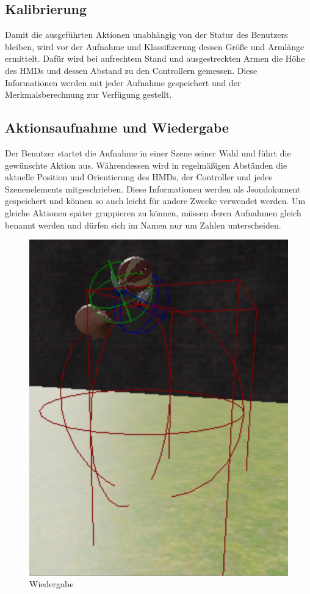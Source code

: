 \subsection{Kalibrierung}
Damit die ausgeführten Aktionen unabhängig von der Statur des Benutzers bleiben, wird vor der Aufnahme und Klassifizerung dessen Größe und Armlänge ermittelt. Dafür wird bei aufrechtem Stand und ausgestreckten Armen die Höhe des HMDs und dessen Abstand zu den Controllern gemessen. Diese Informationen werden mit jeder Aufnahme gespeichert und der Merkmalsberechnung zur Verfügung gestellt. 

\subsection{Aktionsaufnahme und Wiedergabe}
Der Benutzer startet die Aufnahme in einer Szene seiner Wahl und führt die gewünschte Aktion aus. Währendessen wird in regelmäßigen Abständen die aktuelle Position und Orientierung des HMDs, der Controller und jedes Szenenelements mitgeschrieben. Diese Informationen werden als Jsondokument gespeichert und können so auch leicht für andere Zwecke verwendet werden. Um gleiche Aktionen später gruppieren zu können, müssen deren Aufnahmen gleich benannt werden und dürfen sich im Namen nur um Zahlen unterscheiden.\newline
\begin{figure}[hbtp]
\includegraphics[height=0.3\textheight]{PlaybackActor.png}
\caption{Wiedergabe}
\label{fig:PlaybackActor}
\end{figure}
